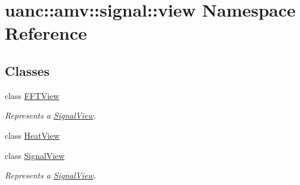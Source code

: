 \hypertarget{namespaceuanc_1_1amv_1_1signal_1_1view}{}\section{uanc\+:\+:amv\+:\+:signal\+:\+:view Namespace Reference}
\label{namespaceuanc_1_1amv_1_1signal_1_1view}
\subsection*{Classes}
\begin{DoxyCompactItemize}
\item 
class \hyperlink{classuanc_1_1amv_1_1signal_1_1view_1_1_f_f_t_view}{F\+F\+T\+View}
\begin{DoxyCompactList}\small\item\em Represents a \hyperlink{classuanc_1_1amv_1_1signal_1_1view_1_1_signal_view}{Signal\+View}. \end{DoxyCompactList}\item 
class \hyperlink{classuanc_1_1amv_1_1signal_1_1view_1_1_heat_view}{Heat\+View}
\item 
class \hyperlink{classuanc_1_1amv_1_1signal_1_1view_1_1_signal_view}{Signal\+View}
\begin{DoxyCompactList}\small\item\em Represents a \hyperlink{classuanc_1_1amv_1_1signal_1_1view_1_1_signal_view}{Signal\+View}. \end{DoxyCompactList}\end{DoxyCompactItemize}
